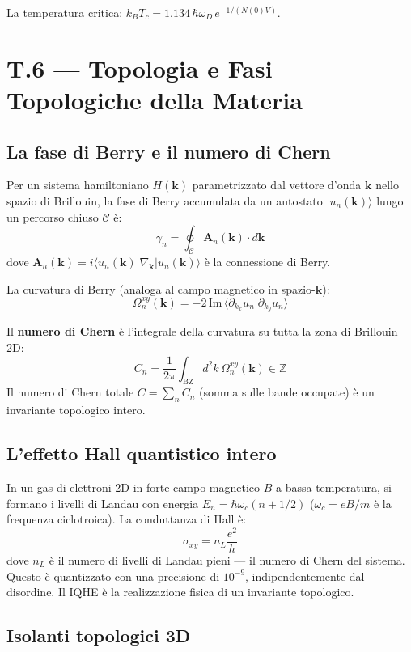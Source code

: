 \documentclass[11.5pt,a4paper,openany]{book}
\theoremstyle{remark}
\begin{document}
La temperatura critica: $k_B T_c = 1.134\,\hbar\omega_D\,e^{-1/(N(0)V)}$.

\chapter*{T.6 — Topologia e Fasi Topologiche della Materia}

\section{La fase di Berry e il numero di Chern}

Per un sistema hamiltoniano $H(\mathbf{k})$ parametrizzato dal vettore d'onda $\mathbf{k}$ nello spazio di Brillouin, la fase di Berry accumulata da un autostato $|u_n(\mathbf{k})\rangle$ lungo un percorso chiuso $\mathcal{C}$ è:
\[
\gamma_n = \oint_\mathcal{C} \mathbf{A}_n(\mathbf{k}) \cdot d\mathbf{k}
\]
dove $\mathbf{A}_n(\mathbf{k}) = i\langle u_n(\mathbf{k})|\nabla_\mathbf{k}|u_n(\mathbf{k})\rangle$ è la connessione di Berry.

La curvatura di Berry (analoga al campo magnetico in spazio-$\mathbf{k}$):
\[
\Omega_n^{xy}(\mathbf{k}) = -2\,\text{Im}\,\langle\partial_{k_x} u_n|\partial_{k_y} u_n\rangle
\]

Il \textbf{numero di Chern} è l'integrale della curvatura su tutta la zona di Brillouin 2D:
\[
C_n = \frac{1}{2\pi}\int_{\text{BZ}} d^2k\, \Omega_n^{xy}(\mathbf{k}) \in \mathbb{Z}
\]
Il numero di Chern totale $C = \sum_n C_n$ (somma sulle bande occupate) è un invariante topologico intero.

\section{L'effetto Hall quantistico intero}

In un gas di elettroni 2D in forte campo magnetico $B$ a bassa temperatura, si formano i livelli di Landau con energia $E_n = \hbar\omega_c(n + 1/2)$ ($\omega_c = eB/m$ è la frequenza ciclotroica). La conduttanza di Hall è:
\[
\sigma_{xy} = n_L \frac{e^2}{h}
\]
dove $n_L$ è il numero di livelli di Landau pieni — il numero di Chern del sistema. Questo è quantizzato con una precisione di $10^{-9}$, indipendentemente dal disordine. Il IQHE è la realizzazione fisica di un invariante topologico.

\section{Isolanti topologici 3D}
\end{document}
